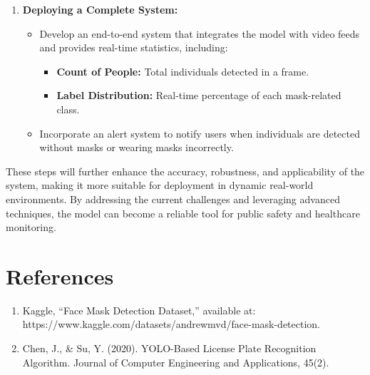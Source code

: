\documentclass[11pt]{article}
\begin{document}
\begin{enumerate}
    \item \textbf{Deploying a Complete System:}
    \begin{itemize}
        \item Develop an end-to-end system that integrates the model with video feeds and provides real-time statistics, including:
        \begin{itemize}
            \item \textbf{Count of People:} Total individuals detected in a frame.
            \item \textbf{Label Distribution:} Real-time percentage of each mask-related class.
        \end{itemize}
        \item Incorporate an alert system to notify users when individuals are detected without masks or wearing masks incorrectly.
    \end{itemize}
\end{enumerate}

These steps will further enhance the accuracy, robustness, and applicability of the system, making it more suitable for deployment in dynamic real-world environments. By addressing the current challenges and leveraging advanced techniques, the model can become a reliable tool for public safety and healthcare monitoring.
\newpage


\section{References}

\begin{enumerate}
    \item Kaggle, “Face Mask Detection Dataset,” available at: \newline
    https://www.kaggle.com/datasets/andrewmvd/face-mask-detection.
    \item Chen, J., \& Su, Y. (2020). YOLO-Based License Plate Recognition Algorithm. Journal of Computer Engineering and Applications, 45(2).
\end{enumerate}
\end{document}
